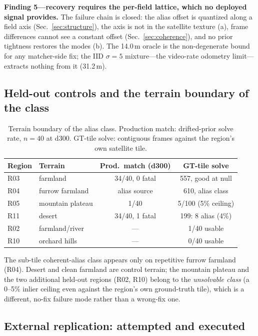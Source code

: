 \documentclass[journal]{IEEEtran}
\begin{document}
\textbf{Finding 5---recovery requires the per-field lattice, which no deployed signal provides.} The failure chain is closed: the alias offset is quantized along a field axis (Sec.~\ref{sec:structure}), the axis is not in the satellite texture (a), frame differences cannot see a constant offset (Sec.~\ref{sec:coherence}), and no prior tightness restores the modes (b). The 14.0\,m oracle is the non-degenerate bound for any matcher-side fix; the IID $\sigma=5$ mixture---the video-rate odometry limit---extracts nothing from it (31.2\,m).

\subsection{Held-out controls and the terrain boundary of the class}
\label{sec:heldout}

\begin{table}[t]
\caption{Terrain boundary of the alias class. Production match: drifted-prior solve rate, $n=40$ at d300. GT-tile solve: contiguous frames against the region's own satellite tile.}
\label{tab:terrain}
\centering
\begin{tabular}{@{}llcc@{}}
\toprule
Region & Terrain & Prod.\ match (d300) & GT-tile solve \\
\midrule
R03 & farmland & 34/40, 0 fatal & 557, good at null \\
R04 & furrow farmland & alias source & 610, alias class \\
R05 & mountain plateau & 1/40 & 5/100 (5\% ceiling) \\
R11 & desert & 34/40, 1 fatal & 199: 8 alias (4\%) \\
R02 & farmland/river & --- & 1/40 usable \\
R10 & orchard hills & --- & 0/40 usable \\
\bottomrule
\end{tabular}
\end{table}

The sub-tile coherent-alias class appears only on repetitive furrow farmland (R04). Desert and clean farmland are control terrain; the mountain plateau and the two additional held-out regions (R02, R10) belong to the \emph{unsolvable class} (a 0--5\% inlier ceiling even against the region's own ground-truth tile), which is a different, no-fix failure mode rather than a wrong-fix one.

\subsection{External replication: attempted and executed}
\label{sec:replication}
\end{document}

